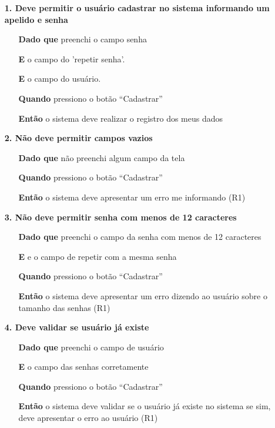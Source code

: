 \begin{itemize}
    \item[] \textbf{1. Deve permitir o usuário cadastrar no sistema informando um apelido e senha}

    \begin{itemize}
        \item[\textbf{Dado que}] preenchi o campo senha
        \item[\textbf{E}] o campo do 'repetir senha'.
        \item[\textbf{E}] o campo do usuário.
        \item[\textbf{Quando}] pressiono o botão ``Cadastrar''
        \item[\textbf{Então}] o sistema deve realizar o registro dos meus dados
    \end{itemize}

    \item[] \textbf{2. Não deve permitir campos vazios}
    
    \begin{itemize}
        \item[\textbf{Dado que}] não preenchi algum campo da tela
        \item[\textbf{Quando}] pressiono o botão ``Cadastrar''
        \item[\textbf{Então}] o sistema deve apresentar um erro me informando (R1)
    \end{itemize}

     \item[] \textbf{3. Não deve permitir senha com menos de 12 caracteres}
    
    \begin{itemize}
        \item[\textbf{Dado que}] preenchi o campo da senha com menos de 12 caracteres
        \item[\textbf{E}] e o campo de repetir com a mesma senha
        \item[\textbf{Quando}] pressiono o botão ``Cadastrar''
        \item[\textbf{Então}] o sistema deve apresentar um erro dizendo ao usuário sobre o tamanho das senhas (R1)
    \end{itemize}

     \item[] \textbf{4. Deve validar se usuário já existe}
    
    \begin{itemize}
        \item[\textbf{Dado que}] preenchi o campo de usuário
        \item[\textbf{E}] o campo das senhas corretamente
        \item[\textbf{Quando}] pressiono o botão ``Cadastrar''
        \item[\textbf{Então}] o sistema deve validar se o usuário já existe no sistema se sim, deve apresentar o erro ao usuário (R1)
    \end{itemize}


\end{itemize}
